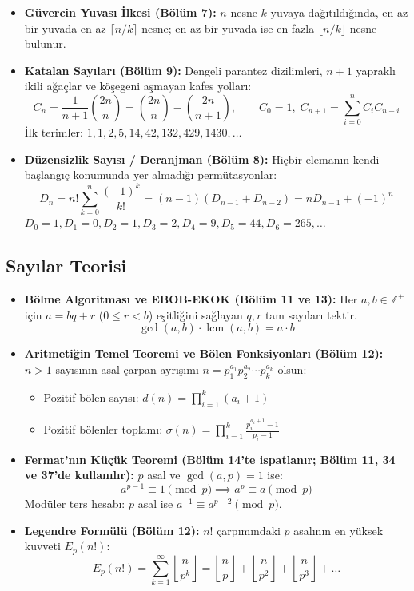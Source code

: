 \begin{itemize}
    \item \textbf{Güvercin Yuvası İlkesi (Bölüm 7):}
    $n$ nesne $k$ yuvaya dağıtıldığında, en az bir yuvada en az $\lceil n/k \rceil$ nesne; en az bir yuvada ise en fazla $\lfloor n/k \rfloor$ nesne bulunur.

    \item \textbf{Katalan Sayıları (Bölüm 9):}
    Dengeli parantez dizilimleri, $n+1$ yapraklı ikili ağaçlar ve köşegeni aşmayan kafes yolları:
    \[
    C_n = \frac{1}{n+1}\binom{2n}{n} = \binom{2n}{n} - \binom{2n}{n+1}, \qquad C_0 = 1, \; C_{n+1} = \sum_{i=0}^n C_i C_{n-i}
    \]
    İlk terimler: $1, 1, 2, 5, 14, 42, 132, 429, 1430, \dots$

    \item \textbf{Düzensizlik Sayısı / Deranjman (Bölüm 8):}
    Hiçbir elemanın kendi başlangıç konumunda yer almadığı permütasyonlar:
    \[
    D_n = n! \sum_{k=0}^n \frac{(-1)^k}{k!} = (n-1)(D_{n-1} + D_{n-2}) = n D_{n-1} + (-1)^n
    \]
    $D_0 = 1, D_1 = 0, D_2 = 1, D_3 = 2, D_4 = 9, D_5 = 44, D_6 = 265, \dots$
\end{itemize}

\subsection{Sayılar Teorisi}

\begin{itemize}
    \item \textbf{Bölme Algoritması ve EBOB-EKOK (Bölüm 11 ve 13):}
    Her $a, b \in \mathbb{Z}^+$ için $a = bq + r$ ($0 \le r < b$) eşitliğini sağlayan $q, r$ tam sayıları tektir.
    \[
    \gcd(a, b) \cdot \operatorname{lcm}(a, b) = a \cdot b
    \]

    \item \textbf{Aritmetiğin Temel Teoremi ve Bölen Fonksiyonları (Bölüm 12):}
    $n > 1$ sayısının asal çarpan ayrışımı $n = p_1^{a_1} p_2^{a_2} \cdots p_k^{a_k}$ olsun:
    \begin{itemize}
        \item Pozitif bölen sayısı: $d(n) = \prod_{i=1}^k (a_i + 1)$
        \item Pozitif bölenler toplamı: $\sigma(n) = \prod_{i=1}^k \frac{p_i^{a_i+1} - 1}{p_i - 1}$
    \end{itemize}

\item \textbf{Fermat'nın Küçük Teoremi (Bölüm 14'te ispatlanır; Bölüm 11, 34 ve 37'de kullanılır):}
    $p$ asal ve $\gcd(a, p) = 1$ ise:
    \[
    a^{p-1} \equiv 1 \pmod p \implies a^p \equiv a \pmod p
    \]
    Modüler ters hesabı: $p$ asal ise $a^{-1} \equiv a^{p-2} \pmod p$.

    \item \textbf{Legendre Formülü (Bölüm 12):}
    $n!$ çarpımındaki $p$ asalının en yüksek kuvveti $E_p(n!)$:
    \[
    E_p(n!) = \sum_{k=1}^{\infty} \left\lfloor \frac{n}{p^k} \right\rfloor = \left\lfloor \frac{n}{p} \right\rfloor + \left\lfloor \frac{n}{p^2} \right\rfloor + \left\lfloor \frac{n}{p^3} \right\rfloor + \dots
    \]
\end{itemize}

